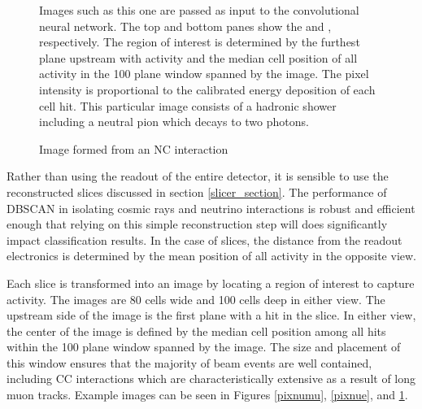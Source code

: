 \begin{figure}
\begin{center}
\begin{subfigure}[c]{0.7\textwidth}
\vspace{-20pt}
\caption*{\yview}
\end{subfigure}
\vspace{-10pt}
\end{center}
\caption{Image formed from an NC interaction}{
Images such as this one are passed as input to the convolutional neural network.
The top and bottom panes show the \xview and \yview, respectively.
The region of interest is determined by the furthest plane upstream with
activity and the median cell position of all activity
in the 100 plane window spanned by the image.
The pixel intensity is proportional to the calibrated energy deposition
of each cell hit.
This particular image consists of a hadronic shower including a neutral
pion which decays to two photons.}
\label{pixnc}
\end{figure}

Rather than using the readout of the entire detector, it is sensible to use
the reconstructed slices discussed in section \ref{slicer_section}.
The performance of DBSCAN in isolating cosmic rays and neutrino interactions
is robust and efficient enough \cite{baird2015thesis} that relying on this
simple reconstruction step will does significantly impact classification
results.
In the case of slices, the distance from the readout electronics is determined
by the mean position of all activity in the opposite view.

Each slice is transformed into an image by locating a region of interest to
capture activity.  The images are 80 cells wide and 100 cells deep in either
view.
The upstream side of the image is the first plane with a hit
in the slice.  In either view, the center of the image is defined by the
median cell position among all hits within the 100 plane window spanned by the
image.
The size and placement of this window ensures that the majority of beam events
are well contained, including \numu CC interactions which are
characteristically extensive as a result of long muon tracks.
Example images can be seen in Figures \ref{pixnumu}, \ref{pixnue},
and \ref{pixnc}.

